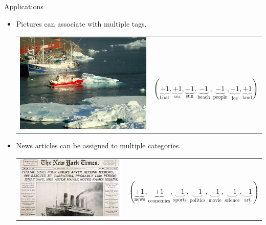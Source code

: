 \documentclass[first=purple,second=dgreen,logo=redexc]{aaltoslides}
\begin{document}
{\begin{frame}{Applications}
	\begin{itemize}
		\item Pictures can associate with multiple tags.
		\begin{tabular}{p{3cm}p{10cm}}
        \multirow{2}{*}{\includegraphics[scale = 0.13]{./figures/boatsea.png}} & \\
		& $(\underbrace{+1}_{\text{boat}},\underbrace{+1}_{\text{sea}},\underbrace{-1}_{\text{sun}},\underbrace{-1}_{\text{beach}},\underbrace{-1}_{\text{people}},\underbrace{+1}_{\text{ice}},\underbrace{+1}_{\text{land}})$\\
        \end{tabular}
		\item News articles can be assigned to multiple categories.
		\begin{tabular}{p{3cm}p{10cm}} 
        \multirow{2}{*}{\includegraphics[scale = 0.13]{./figures/titanic.jpg}} & \\
		& $(\underbrace{+1}_{\text{news}},\underbrace{+1}_{\text{economics}},\underbrace{-1}_{\text{sports}},\underbrace{-1}_{\text{politics}},\underbrace{-1}_{\text{movie}},\underbrace{-1}_{\text{science}},\underbrace{-1}_{\text{art}})$\\

\end{tabular}
\end{itemize}
\end{frame}}
\end{document}
